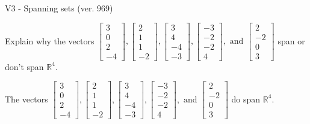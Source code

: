 \begin{exercise}
  \begin{exerciseTitle}V3 - Spanning sets (ver. 969)\end{exerciseTitle}
  \begin{exerciseStatement}
    Explain why the vectors \(\left[\begin{array}{r}
3 \\
0 \\
2 \\
-4
\end{array}\right] , \left[\begin{array}{r}
2 \\
1 \\
1 \\
-2
\end{array}\right] , \left[\begin{array}{r}
3 \\
4 \\
-4 \\
-3
\end{array}\right] , \left[\begin{array}{r}
-3 \\
-2 \\
-2 \\
4
\end{array}\right] , \text{ and } \left[\begin{array}{r}
2 \\
-2 \\
0 \\
3
\end{array}\right]\) span or don't span \(\mathbb{R}^4\). 
	


  \end{exerciseStatement}
  \begin{exerciseAnswer}
   The vectors \(\left[\begin{array}{r}
3 \\
0 \\
2 \\
-4
\end{array}\right] , \left[\begin{array}{r}
2 \\
1 \\
1 \\
-2
\end{array}\right] , \left[\begin{array}{r}
3 \\
4 \\
-4 \\
-3
\end{array}\right] , \left[\begin{array}{r}
-3 \\
-2 \\
-2 \\
4
\end{array}\right] , \text{ and } \left[\begin{array}{r}
2 \\
-2 \\
0 \\
3
\end{array}\right]\) 
  	 do  
	span \(\mathbb{R}^4\).
  



\end{exerciseAnswer}
\end{exercise}
